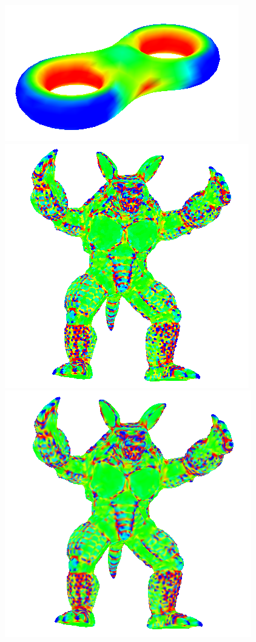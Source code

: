 \begin{figure}[H]
    \endminipage\hfill
    \centering
    \includegraphics[scale=0.9]{images/gci-eight.png}
    \endminipage\hfill
    \centering
    \includegraphics[scale=0.9]{images/gc-armadillo.png}
    \endminipage\hfill
    \centering
    \includegraphics[scale=0.9]{images/gci-armadillo.png}

\end{figure}
